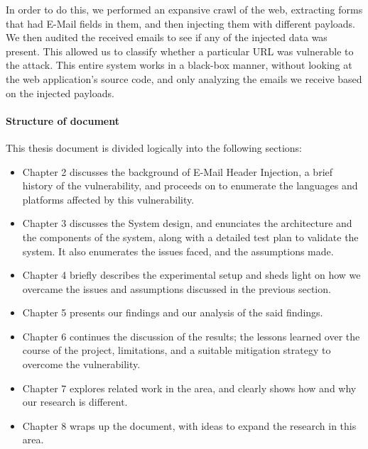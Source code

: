 	In order to do this, we performed an expansive crawl of the web, extracting forms that had E-Mail fields in them, and then injecting them with different payloads. We then audited the received emails to see if any of the injected data was present. This allowed us to classify whether a particular URL was vulnerable to the attack. This entire system works in a black-box manner, without looking at the web application's source code, and only analyzing the emails we receive based on the injected payloads.

\paragraph{Structure of document} %
This thesis document is divided logically into the following sections:
\begin{itemize}
	\item Chapter 2 discusses the background of E-Mail Header Injection, a brief history of the vulnerability, and proceeds on to enumerate the languages and platforms affected by this vulnerability.
	
	\item Chapter 3 discusses the System design, and enunciates the architecture and the components of the system, along with a detailed test plan to validate the system. It also enumerates the issues faced, and the assumptions made.
	
	\item Chapter 4 briefly describes the experimental setup and sheds light on how we overcame the issues and assumptions discussed in the previous section.
	
	\item Chapter 5 presents our findings and our analysis of the said findings.
	
	\item Chapter 6 continues the discussion of the results; the lessons learned over the course of the project, limitations, and a suitable mitigation strategy to overcome the vulnerability.
	
	\item Chapter 7 explores related work in the area, and clearly shows how and why our research is different.
	
	\item Chapter 8 wraps up the document, with ideas to expand the research in this area.
\end{itemize} 

